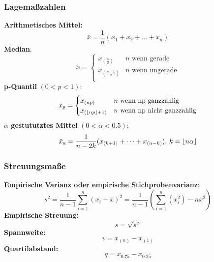 \documentclass[
	ngerman,
	accentcolor=9c,%
	type=intern,
	marginpar=false
	]{tudapub}
\DeclarePairedDelimiter\floor{\lfloor}{\rfloor}
\begin{document}
            \subsubsection{Lagemaßzahlen}
                \textbf{Arithmetisches Mittel:}
                \begin{equation*}
                    \bar{x}=\dfrac{1}{n}(x_1+x_2+\dots+x_n)
                \end{equation*}
                \textbf{Median}:
                \begin{equation}
                    \tilde{x} =
                    \begin{cases}
                        x_{(\frac{n}{2})} & n \text{ wenn gerade}\\
                        x_{(\frac{n+1}{2})} & n \text{ wenn ungerade}\\
                    \end{cases}
                \end{equation}
                \textbf{p-Quantil} $(0<p<1)$:
                \begin{equation}
                    x_p=
                    \begin{cases}
                        x_{(np)} & n \text{ wenn np ganzzahlig}\\
                        x_{(\floor{np}+1)} & n \text{ wenn np nicht ganzzahlig}\\
                    \end{cases}
                \end{equation}
                \textbf{$\alpha$ gestututztes Mittel} $(0<\alpha<0.5)$:
                \begin{equation*}
                    \bar{x}_a = \dfrac{1}{n-2k}(x_{(k+1)} + \dots + x_{(n-k)})\mbox{, }k=\floor{n\alpha}
                \end{equation*}
            \subsubsection{Streuungsmaße}
                \textbf{Empirische Varianz oder empirische Stichprobenvarianz}:
                \begin{equation*}
                    s^2 = \dfrac{1}{n-1}\sum_{i=1}^n (x_i - \bar{x})^2
                    = \dfrac{1}{n-1} \left( \sum_{i=1}^n \left(x_i^2\right) - n\bar{x}^2 \right)
                \end{equation*}
                \textbf{Empirische Streuung:}
                \begin{equation*}
                    s = \sqrt{s^2}
                \end{equation*}
                \textbf{Spannweite:}
                \begin{equation*}
                    v= x_{(n)} - x_{(1)}
                \end{equation*}
                \textbf{Quartilabstand:}
                \begin{equation*}
                    q = x_{0.75} - x_{0.25}
                \end{equation*}
\end{document}

